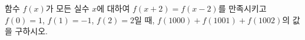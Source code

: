 함수 $f(x)$가 모든 실수 $x$에 대하여 $f(x+2)=f(x-2)$를 만족시키고 $f(0)=1$, $f(1)=-1$, $f(2)=2$일 때, $f(1000)+f(1001)+f(1002)$의 값을 구하시오.
